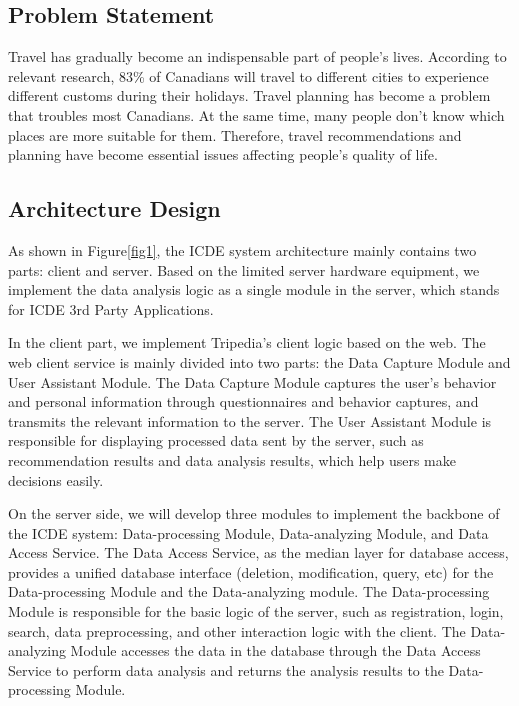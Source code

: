 \documentclass[conference]{IEEEtran}
\begin{document}
\subsection{Problem Statement}

Travel has gradually become an indispensable part of people's lives. According to relevant research, 83\% of Canadians will travel to different cities to experience different customs during their holidays. Travel planning has become a problem that troubles most Canadians. At the same time, many people don’t know which places are more suitable for them. Therefore, travel recommendations and planning have become essential issues affecting people's quality of life.


\subsection{Architecture Design}

As shown in Figure\ref{fig1}, the ICDE system architecture mainly contains two parts: client and server. Based on the limited server hardware equipment, we implement the data analysis logic as a single module in the server, which stands for ICDE 3rd Party Applications. 

In the client part, we implement Tripedia's client logic based on the web. The web client service is mainly divided into two parts: the Data Capture Module and User Assistant Module. The Data Capture Module captures the user's behavior and personal information through questionnaires and behavior captures, and transmits the relevant information to the server. The User Assistant Module is responsible for displaying processed data sent by the server, such as recommendation results and data analysis results, which help users make decisions easily.

On the server side, we will develop three modules to implement the backbone of the ICDE system: Data-processing Module, Data-analyzing Module, and Data Access Service. The Data Access Service, as the median layer for database access, provides a unified database interface (deletion, modification, query, etc) for the Data-processing Module and the Data-analyzing module. The Data-processing Module is responsible for the basic logic of the server, such as registration, login, search, data preprocessing, and other interaction logic with the client. The Data-analyzing Module accesses the data in the database through the Data Access Service to perform data analysis and returns the analysis results to the Data-processing Module.
\end{document}

